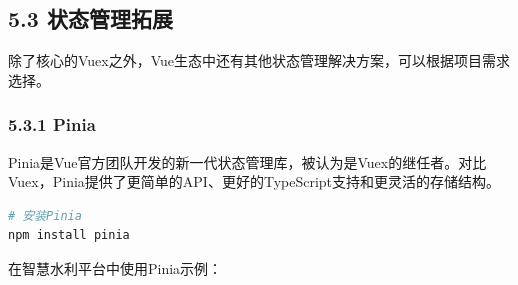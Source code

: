 \subsection{5.3
状态管理拓展}\label{ux72b6ux6001ux7ba1ux7406ux62d3ux5c55}

除了核心的Vuex之外，Vue生态中还有其他状态管理解决方案，可以根据项目需求选择。

\subsubsection{5.3.1 Pinia}\label{pinia}

Pinia是Vue官方团队开发的新一代状态管理库，被认为是Vuex的继任者。对比Vuex，Pinia提供了更简单的API、更好的TypeScript支持和更灵活的存储结构。

\begin{lstlisting}[language=bash]
# 安装Pinia
npm install pinia
\end{lstlisting}

在智慧水利平台中使用Pinia示例：

